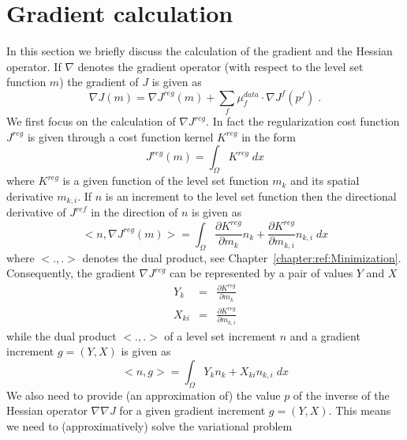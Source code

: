 \section{Gradient calculation}\label{chapter:ref:inversion cost function:gradient}
In this section we briefly discuss the calculation of the gradient and the Hessian operator.
If $\nabla$ denotes the gradient operator (with respect to the level set function $m$) 
the gradient of  $J$ is given as
\begin{equation}\label{REF:EQU:DRIVE:10b}
\nabla J(m) = \nabla J^{reg}(m) + \sum_{f} \mu^{data}_{f} \cdot \nabla J^{f}(p^f) \; .
\end{equation} 
We first focus on the calculation of $\nabla J^{reg}$. In fact the 
regularization cost function $J^{reg}$ is given through a cost function
kernel $K^{reg}$ in the form
\begin{equation}\label{REF:EQU:INTRO 2a}
J^{reg}(m) = \int_{\Omega} K^{reg} \; dx
\end{equation} 
where $K^{reg}$ is a given function of the
level set function $m_k$ and its spatial derivative $m_{k,i}$. If $n$ is an increment to the level set function 
then the directional derivative of $J^{ref}$ in the direction of $n$ is given as
\begin{equation}\label{REF:EQU:INTRO 2aa}
<n, \nabla J^{reg}(m)> = \int_{\Omega} \frac{ \partial K^{reg}}{\partial m_k} n_k + \frac{ \partial K^{reg}}{\partial m_{k,i}} n_{k,i} \; dx
\end{equation} 
where $<.,.>$ denotes the dual product, see Chapter~\ref{chapter:ref:Minimization}. Consequently, the gradient $\nabla J^{reg}$
can be represented by a pair of values $Y$ and $X$ 
\begin{equation}\label{ref:EQU:CS:101}
\begin{array}{rcl}
  Y_k & = & \displaystyle{\frac{\partial K^{reg}}{\partial m_k}} \\
   X_{ki} & = & \displaystyle{\frac{\partial K^{reg}}{\partial m_{k,i}}} 
\end{array}
\end{equation} 
while the dual product $<.,.>$ of a level set increment $n$ and a gradient increment $g=(Y,X)$ is given as
\begin{equation}\label{REF:EQU:INTRO 2aaa}
<n,g> = \int_{\Omega} Y_k n_k + X_{ki} n_{k,i} \; dx
\end{equation} 
We also need to provide (an approximation of) the value $p$ of the inverse of the Hessian operator $\nabla \nabla J$
for a given gradient increment $g=(Y,X)$. This means we need to (approximatively) solve the variational problem 
